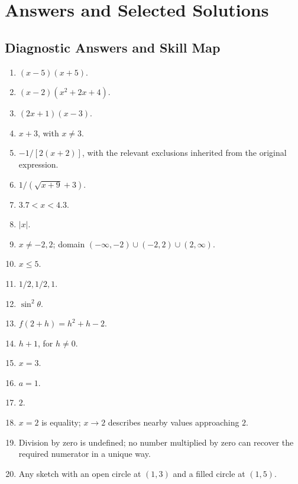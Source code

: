 \documentclass[11pt,openany]{book}
\theoremstyle{bgplain}
\begin{document}

\appendix

\chapter{Answers and Selected Solutions}

\section{Diagnostic Answers and Skill Map}
\label{app:diagnostic-answers}

\begin{enumerate}
  \item \((x-5)(x+5)\).
  \item \((x-2)(x^2+2x+4)\).
  \item \((2x+1)(x-3)\).
  \item \(x+3\), with \(x\ne3\).
  \item \(-1/[2(x+2)]\), with the relevant exclusions inherited from the original expression.
  \item \(1/(\sqrt{x+9}+3)\).
  \item \(3.7<x<4.3\).
  \item \(|x|\).
  \item \(x\ne-2,2\); domain \(( -\infty,-2)\cup(-2,2)\cup(2,\infty)\).
  \item \(x\le5\).
  \item \(1/2,1/2,1\).
  \item \(\sin^2\theta\).
  \item \(f(2+h)=h^2+h-2\).
  \item \(h+1\), for \(h\ne0\).
  \item \(x=3\).
  \item \(a=1\).
  \item \(2\).
  \item \(x=2\) is equality; \(x\to2\) describes nearby values approaching \(2\).
  \item Division by zero is undefined; no number multiplied by zero can recover the required numerator in a unique way.
  \item Any sketch with an open circle at \((1,3)\) and a filled circle at \((1,5)\).
\end{enumerate}
\end{document}
